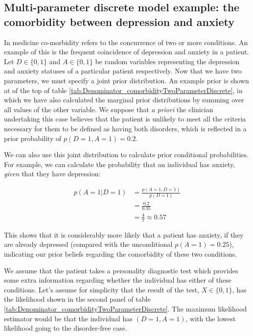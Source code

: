 \documentclass[11pt,fullpage]{book}
\begin{document}
\subsection{Multi-parameter discrete model example: the comorbidity between depression and anxiety}\label{sec:Denominator_comorbidityTwoParameterDiscrete}
In medicine co-morbidity refers to the concurrence of two or more conditions. An example of this is the frequent coincidence of depression and anxiety in a patient. Let $D\in\{0,1\}$ and $A\in\{0,1\}$ be random variables representing the depression and anxiety statuses of a particular patient respectively. Now that we have two parameters, we must specify a joint prior distribution. An example prior is shown at of the top of table \ref{tab:Denominator_comorbidityTwoParameterDiscrete}, in which we have also calculated the marginal prior distributions by summing over all values of the other variable. We suppose that \textit{a priori} the clinician undertaking this case believes that the patient is unlikely to meet all the criteria necessary for them to be defined as having both disorders, which is reflected in a prior probability of $p(D=1,A=1)=0.2$.

We can also use this joint distribution to calculate prior conditional probabilities. For example, we can calculate the probability that an individual has anxiety, \textit{given} that they have depression:

\begin{equation}
\begin{align}
p(A=1|D=1) &= \frac{p(A=1,D=1)}{p(D=1)}\\
&= \frac{0.2}{0.35}\\
&=\frac{4}{7}\approx 0.57
\end{align}
\end{equation}

This shows that it is considerably more likely that a patient has anxiety, if they are already depressed (compared with the unconditional $p(A=1)=0.25$), indicating our prior beliefs regarding the comorbidity of these two conditions.

We assume that the patient takes a personality diagnostic test which provides some extra information regarding whether the individual has either of these conditions. Let's assume for simplicity that the result of the test, $X\in\{0,1\}$, has the likelihood shown in the second panel of table \ref{tab:Denominator_comorbidityTwoParameterDiscrete}. The maximum likelihood estimator would be that the individual has $(D=1,A=1)$, with the lowest likelihood going to the disorder-free case.
\end{document}
